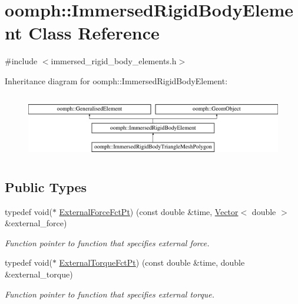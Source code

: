 \hypertarget{classoomph_1_1ImmersedRigidBodyElement}{}\section{oomph\+:\+:Immersed\+Rigid\+Body\+Element Class Reference}
\label{classoomph_1_1ImmersedRigidBodyElement}


{\ttfamily \#include $<$immersed\+\_\+rigid\+\_\+body\+\_\+elements.\+h$>$}

Inheritance diagram for oomph\+:\+:Immersed\+Rigid\+Body\+Element\+:\begin{figure}[H]
\begin{center}
\leavevmode
\includegraphics[height=2.837838cm]{classoomph_1_1ImmersedRigidBodyElement}
\end{center}
\end{figure}
\subsection*{Public Types}
\begin{DoxyCompactItemize}
\item 
typedef void($\ast$ \hyperlink{classoomph_1_1ImmersedRigidBodyElement_a7a43bfd54213becfb135b594720b0539}{External\+Force\+Fct\+Pt}) (const double \&time, \hyperlink{classoomph_1_1Vector}{Vector}$<$ double $>$ \&external\+\_\+force)
\begin{DoxyCompactList}\small\item\em Function pointer to function that specifies external force. \end{DoxyCompactList}\item 
typedef void($\ast$ \hyperlink{classoomph_1_1ImmersedRigidBodyElement_a455638a1d0e9547290d835513d00c40e}{External\+Torque\+Fct\+Pt}) (const double \&time, double \&external\+\_\+torque)
\begin{DoxyCompactList}\small\item\em Function pointer to function that specifies external torque. \end{DoxyCompactList}\end{DoxyCompactItemize}
